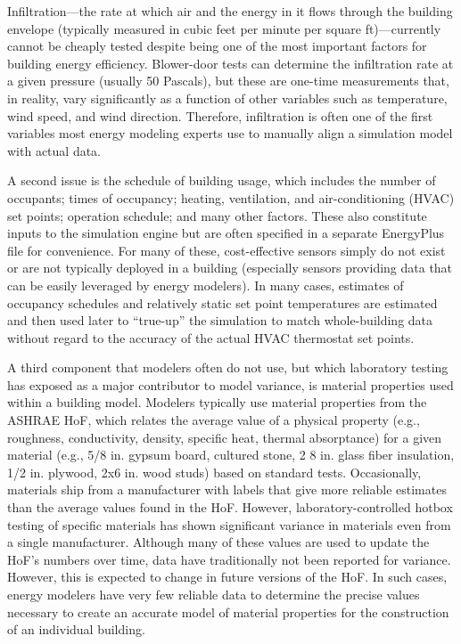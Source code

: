 \documentclass[preprint, review, 12pt]{elsarticle}
\begin{document}
Infiltration---the rate at which air and the energy in it flows through the building envelope (typically measured in cubic feet per minute per square ft)---currently cannot be cheaply tested despite being one of the most important factors for building energy efficiency. Blower-door tests can determine the infiltration rate at a given pressure (usually 50 Pascals), but these are one-time measurements that, in reality, vary significantly as a function of other variables such as temperature, wind speed, and wind direction. Therefore, infiltration is often one of the first variables most energy modeling experts use to manually align a simulation model with actual data.

A second issue is the schedule of building usage, which includes the number of occupants; times of occupancy; heating, ventilation, and air-conditioning (HVAC) set points; operation schedule; and many other factors. These also constitute inputs to the simulation engine but are often specified in a separate EnergyPlus file for convenience. For many of these, cost-effective sensors simply do not exist or are not typically deployed in a building (especially sensors providing data that can be easily leveraged by energy modelers). In many cases, estimates of occupancy schedules and relatively static set point temperatures are estimated and then used later to ``true-up'' the simulation to match whole-building data without regard to the accuracy of the actual HVAC thermostat set points.

A third component that modelers often do not use, but which laboratory testing has exposed as a major contributor to model variance, is material properties used within a building model. Modelers typically use material properties from the ASHRAE HoF, which relates the average value of a physical property (e.g., roughness, conductivity, density, specific heat, thermal absorptance) for a given material (e.g., 5/8 in. gypsum board, cultured stone, 2 {8} in. glass fiber insulation, 1/2 in. plywood, 2x6 in. wood studs) based on standard tests. Occasionally, materials ship from a manufacturer with labels that give more reliable estimates than the average values found in the HoF. However, laboratory-controlled hotbox testing of specific materials has shown significant variance in materials even from a single manufacturer. Although many of these values are used to update the HoF's numbers over time, data have traditionally not been reported for variance. However, this is expected to change in future versions of the HoF. In such cases, energy modelers have very few reliable data to determine the precise values necessary to create an accurate model of material properties for the construction of an individual building.
\end{document}
